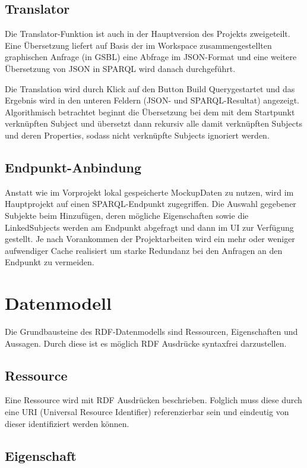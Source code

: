 \subsection*{Translator}

Die Translator-Funktion ist auch in der Hauptversion des Projekts
zweigeteilt. Eine Übersetzung liefert auf Basis der im Workspace
zusammengestellten graphischen Anfrage (in GSBL) eine Abfrage im
JSON-Format und eine weitere Übersetzung von JSON in SPARQL wird
danach durchgeführt.

Die Translation wird durch Klick auf den Button \glqq Build Query\grqq gestartet und das Ergebnis wird in den unteren Feldern (JSON- und SPARQL-Resultat) angezeigt.
Algorithmisch betrachtet beginnt die Übersetzung bei dem mit dem
Startpunkt verknüpften Subject und übersetzt dann rekursiv alle damit
verknüpften Subjects und deren Properties, sodass nicht verknüpfte
Subjects ignoriert werden.


\subsection*{Endpunkt-Anbindung}

Anstatt wie im Vorprojekt lokal gespeicherte MockupDaten zu nutzen,
wird im Hauptprojekt auf einen SPARQL-Endpunkt zugegriffen. Die
Auswahl gegebener Subjekte beim Hinzufügen, deren mögliche
Eigenschaften sowie die LinkedSubjects werden am Endpunkt abgefragt
und dann im UI zur Verfügung gestellt. Je nach Vorankommen der
Projektarbeiten wird ein mehr oder weniger aufwendiger Cache
realisiert um starke Redundanz bei den Anfragen an den Endpunkt zu
vermeiden.

\section{Datenmodell}

Die Grundbausteine des RDF-Datenmodells sind Ressourcen, Eigenschaften und Aussagen. Durch diese ist es möglich RDF Ausdrücke syntaxfrei darzustellen.

\subsection*{Ressource}

Eine Ressource wird mit RDF Ausdrücken beschrieben. Folglich muss diese durch eine URI (Universal Resource Identifier) referenzierbar sein und eindeutig von dieser identifiziert werden können.

\subsection*{Eigenschaft}

